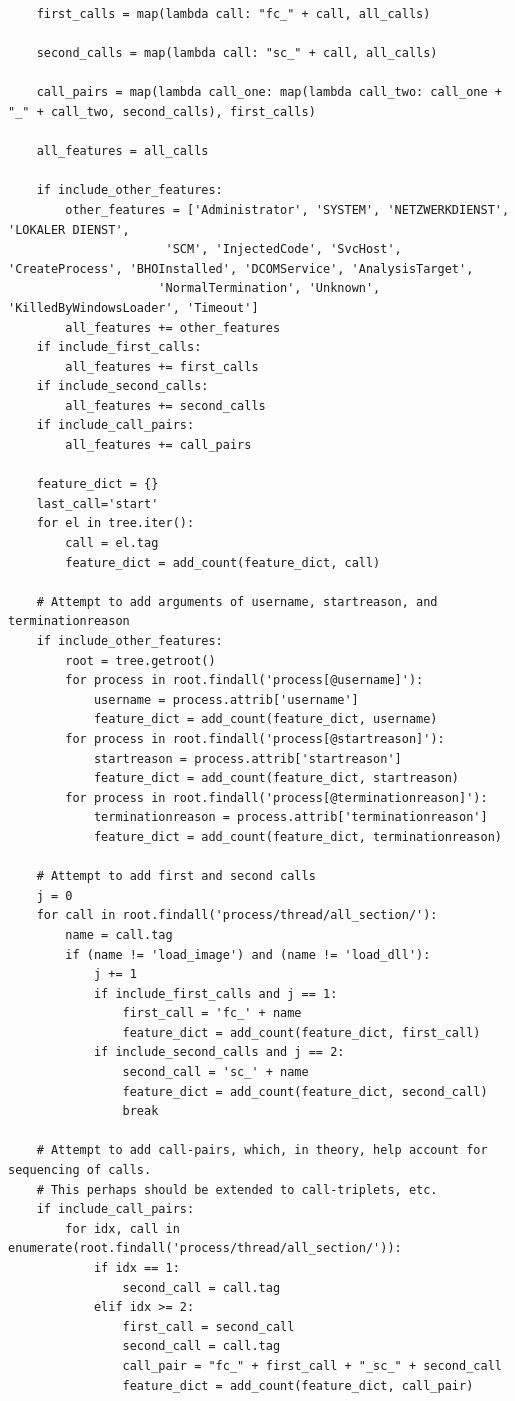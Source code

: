 \documentclass[11pt]{article}
\begin{document}
\begin{lstlisting}
    first_calls = map(lambda call: "fc_" + call, all_calls)

    second_calls = map(lambda call: "sc_" + call, all_calls)

    call_pairs = map(lambda call_one: map(lambda call_two: call_one + "_" + call_two, second_calls), first_calls)

    all_features = all_calls

    if include_other_features:
        other_features = ['Administrator', 'SYSTEM', 'NETZWERKDIENST', 'LOKALER DIENST', 
                      'SCM', 'InjectedCode', 'SvcHost', 'CreateProcess', 'BHOInstalled', 'DCOMService', 'AnalysisTarget',
                     'NormalTermination', 'Unknown', 'KilledByWindowsLoader', 'Timeout']
        all_features += other_features
    if include_first_calls:
        all_features += first_calls
    if include_second_calls:
        all_features += second_calls
    if include_call_pairs:
        all_features += call_pairs

    feature_dict = {}
    last_call='start'
    for el in tree.iter():
        call = el.tag
        feature_dict = add_count(feature_dict, call)
    
    # Attempt to add arguments of username, startreason, and terminationreason
    if include_other_features:
        root = tree.getroot()
        for process in root.findall('process[@username]'):
            username = process.attrib['username']
            feature_dict = add_count(feature_dict, username)
        for process in root.findall('process[@startreason]'):
            startreason = process.attrib['startreason']
            feature_dict = add_count(feature_dict, startreason)
        for process in root.findall('process[@terminationreason]'):
            terminationreason = process.attrib['terminationreason']
            feature_dict = add_count(feature_dict, terminationreason)

    # Attempt to add first and second calls
    j = 0
    for call in root.findall('process/thread/all_section/'):
        name = call.tag
        if (name != 'load_image') and (name != 'load_dll'): 
            j += 1
            if include_first_calls and j == 1:
                first_call = 'fc_' + name
                feature_dict = add_count(feature_dict, first_call)
            if include_second_calls and j == 2:
                second_call = 'sc_' + name
                feature_dict = add_count(feature_dict, second_call)
                break
    
    # Attempt to add call-pairs, which, in theory, help account for sequencing of calls.
    # This perhaps should be extended to call-triplets, etc.
    if include_call_pairs:
        for idx, call in enumerate(root.findall('process/thread/all_section/')):
            if idx == 1:
                second_call = call.tag
            elif idx >= 2:
                first_call = second_call
                second_call = call.tag
                call_pair = "fc_" + first_call + "_sc_" + second_call
                feature_dict = add_count(feature_dict, call_pair)
            

\end{lstlisting}
\end{document}
